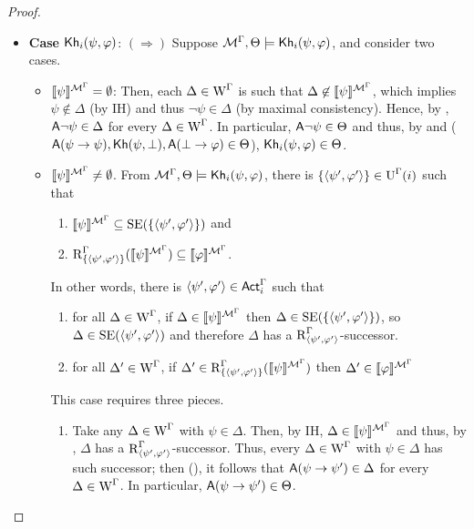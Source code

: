 \begin{proof}
\begin{itemize}
\item \textbf{Case ${\sf Kh}_i(\psi,\varphi)$}: $(\Rightarrow)$ Suppose $\mathcal{M}^\Gamma, \Theta \models {\sf Kh}_i(\psi,\varphi)$, and consider two cases.
\begin{itemize}
\item ${\llbracket \psi \rrbracket^{\mathcal{M}^\Gamma} = \emptyset}$: Then, each $\Delta \in \operatorname{W}^\Gamma$ is such that $\Delta \not\in \llbracket \psi \rrbracket^{\mathcal{M}^\Gamma}$, which implies $\psi \not\in \Delta$ (by IH) and thus $\lnot\psi \in \Delta$ (by maximal consistency).
Hence, by , ${\sf A}\lnot\psi \in \Delta$ for every $\Delta \in \operatorname{W}^\Gamma$. In particular, ${\sf A}\lnot\psi \in \Theta$ and thus, by  and  (${\sf A}(\psi \rightarrow \psi),{\sf Kh}(\psi,\bot),{\sf A}(\bot \rightarrow \varphi) \in \Theta$), ${\sf Kh}_i(\psi, \varphi) \in \Theta$.
\item ${\llbracket \psi \rrbracket^{\mathcal{M}^\Gamma} \neq \emptyset}$.
From $\mathcal{M}^\Gamma, \Theta \models {\sf Kh}_i(\psi,\varphi)$, there is $\{ \langle \psi',\varphi' \rangle \} \in \operatorname{U}^\Gamma(i)$ such that
\begin{enumerate}
\item $\llbracket \psi \rrbracket^{\mathcal{M}^\Gamma} \subseteq \operatorname{SE}(\{ \langle \psi',\varphi' \rangle \})$ and
\item $\operatorname{R}^\Gamma_{\{ \langle \psi',\varphi' \rangle \}}(\llbracket \psi \rrbracket^{\mathcal{M}^\Gamma}) \subseteq \llbracket \varphi \rrbracket^{\mathcal{M}^\Gamma}$.
\end{enumerate}
In other words, there is $\langle \psi',\varphi' \rangle \in {\rm \sf Act}^\Gamma_i$ such that
\begin{enumerate}
    \item\label{tlm:cm-esmiv-stexec-lkhi-itm:i} for all $\Delta \in \operatorname{W}^\Gamma$, if $\Delta \in \llbracket \psi \rrbracket^{\mathcal{M}^\Gamma}$ then $\Delta \in \operatorname{SE}(\{ \langle \psi',\varphi' \rangle \})$, so $\Delta \in \operatorname{SE}(\langle \psi',\varphi' \rangle)$ and therefore $\Delta$ has a $\operatorname{R}^\Gamma_{\langle \psi',\varphi' \rangle}$-successor.
    \item\label{tlm:cm-esmiv-stexec-lkhi-itm:ii} for all $\Delta' \in \operatorname{W}^\Gamma$, if $\Delta' \in \operatorname{R}^\Gamma_{\{ \langle \psi',\varphi' \rangle \}}(\llbracket \psi \rrbracket^{\mathcal{M}^\Gamma})$ then $\Delta' \in \llbracket \varphi \rrbracket^{\mathcal{M}^\Gamma}$
\end{enumerate}
This case requires three pieces.
\begin{enumerate}
    \item Take any $\Delta \in \operatorname{W}^\Gamma$ with $\psi \in \Delta$. Then, by IH, $\Delta \in \llbracket \psi \rrbracket^{\mathcal{M}^\Gamma}$ and thus, by , $\Delta$ has a $\operatorname{R}^\Gamma_{\langle \psi',\varphi' \rangle}$-successor.
    Thus, every $\Delta \in \operatorname{W}^\Gamma$ with $\psi \in \Delta$ has such successor; then (), it follows that ${\sf A}(\psi \rightarrow \psi') \in \Delta$ for every $\Delta \in \operatorname{W}^\Gamma$.
    In particular, ${\sf A}(\psi \rightarrow \psi') \in \Theta$.


\end{enumerate}
\end{itemize}
\end{itemize}
\end{proof}
